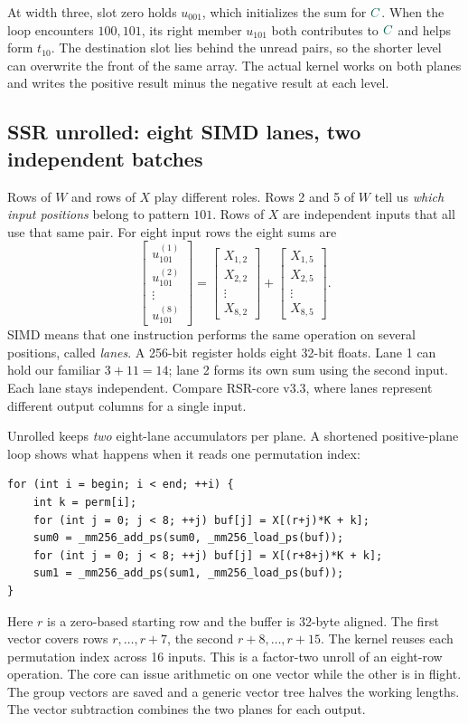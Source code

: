 \documentclass[11pt,a4paper]{article}
\newcommand{\ccol}[1]{\textcolor{outC}{#1}}
\begin{document}
At width three, slot zero holds \(u_{001}\), which initializes the sum for
\(\ccol C\). When the loop encounters \(100,101\), its right member
\(u_{101}\) both contributes to \(\ccol C\) and helps form \(t_{10}\).
The destination slot lies behind the unread pairs, so the shorter level can
overwrite the front of the same array. The actual kernel works on both planes
and writes the positive result minus the negative result at each level.

\subsection{SSR unrolled: eight SIMD lanes, two independent batches}
Rows of \(W\) and rows of \(X\) play different roles. Rows 2 and 5 of
\(W\) tell us \emph{which input positions} belong to pattern \(101\).
Rows of \(X\) are independent inputs that all use that same pair. For
eight input rows the eight sums are
\[
\begin{bmatrix}u_{101}^{(1)}\\u_{101}^{(2)}\\\vdots\\u_{101}^{(8)}\end{bmatrix}
=
\begin{bmatrix}X_{1,2}\\X_{2,2}\\\vdots\\X_{8,2}\end{bmatrix}
+
\begin{bmatrix}X_{1,5}\\X_{2,5}\\\vdots\\X_{8,5}\end{bmatrix}.
\]
SIMD means that one instruction performs the same operation on several
positions, called \emph{lanes}. A 256-bit register holds eight 32-bit floats.
Lane 1 can hold our familiar \(3+11=14\); lane 2 forms its own sum using the
second input. Each lane stays independent. Compare RSR-core v3.3, where lanes
represent different output columns for a single input.

Unrolled keeps \emph{two} eight-lane accumulators per plane. A shortened
positive-plane loop shows what happens when it reads one permutation index:
\begin{lstlisting}
for (int i = begin; i < end; ++i) {
    int k = perm[i];
    for (int j = 0; j < 8; ++j) buf[j] = X[(r+j)*K + k];
    sum0 = _mm256_add_ps(sum0, _mm256_load_ps(buf));
    for (int j = 0; j < 8; ++j) buf[j] = X[(r+8+j)*K + k];
    sum1 = _mm256_add_ps(sum1, _mm256_load_ps(buf));
}
\end{lstlisting}
Here \(r\) is a zero-based starting row and the buffer is 32-byte aligned.
The first vector covers rows \(r,\ldots,r+7\), the second \(r+8,\ldots,r+15\).
The kernel reuses each permutation index across 16 inputs. This is a
factor-two unroll of an eight-row operation. The core can issue arithmetic
on one vector while the other is in flight. The group vectors are saved and
a generic vector tree halves the working lengths. The vector subtraction
combines the two planes for each output.
\end{document}
